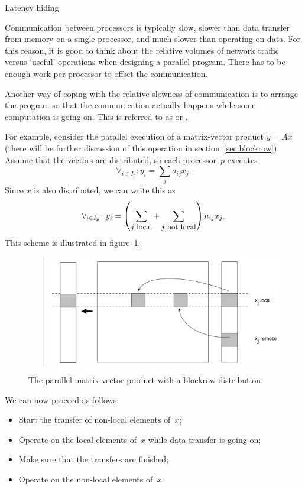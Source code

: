  {Latency hiding}
\label{sec:comcom-overlap}

Communication between processors is typically slow, slower than data
transfer from memory on a single processor, and much slower than
operating on data. For this reason, it is good to think about the
relative volumes of network traffic versus `useful' operations when
designing a parallel program. There has to be enough work per
processor to offset the communication.

Another way of coping with the relative slowness of
communication is to arrange the program so that the communication
actually happens while some computation is going on. This is referred
to as  or
.

For example, consider the parallel execution of a matrix-vector
product $y=Ax$ (there will be further discussion of this operation in
section~\ref{sec:blockrow}). Assume that the vectors are distributed,
so each processor~$p$ executes
\[ \forall_{i\in I_p}\colon y_i=\sum_j a_{ij}x_j. \]
Since $x$ is also distributed, we can write this as
\[ \forall_{i\in I_p}\colon y_i=
  \left(\sum_{\mbox{\small $j$ local}}
    +\sum_{\mbox{\small $j$ not local}} \right) a_{ij}x_j. 
\]
This scheme is illustrated in figure~\ref{fig:distmvp}.
\begin{figure}
  \begin{quote}
  \includegraphics[scale=.12]{graphics/distmvp}
  \end{quote}
  \caption{The parallel matrix-vector product with a blockrow
    distribution.}
  \label{fig:distmvp}
\end{figure}
We can now proceed as follows:
\begin{itemize}
\item Start the transfer of non-local elements of~$x$;
\item Operate on the local elements of~$x$ while data transfer is
  going on;
\item Make sure that the transfers are finished;
\item Operate on the non-local elements of~$x$.
\end{itemize}

